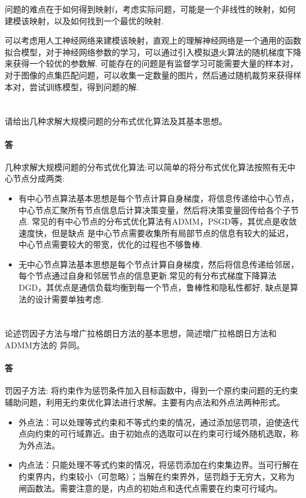 \documentclass[a4paper]{article}
\begin{document}
问题的难点在于如何得到映射f，考虑实际问题，可能是一个非线性的映射，如何建模该映射，以及如何找到一个最优的映射.

可以考虑用人工神经网络来建模该映射，直观上的理解神经网络是一个通用的函数拟合模型，对于神经网络参数的学习，可以通过引入模拟退火算法的随机梯度下降来获得一个较优的参数解. 可能存在的问题是有监督学习可能需要大量的样本对，对于图像的点集匹配问题，可以收集一定数量的图片，然后通过随机裁剪来获得样本对，尝试训练模型，得到问题的解.


\section{}
请给出几种求解大规模问题的分布式优化算法及其基本思想。 

\paragraph{答}
几种求解大规模问题的分布式优化算法:可以简单的将分布式优化算法按照有无中心节点分成两类:
\begin{itemize}
   \item 有中心节点算法基本思想是每个节点计算自身梯度，将信息传递给中心节点，中心节点汇聚所有节点信息后计算决策变量，然后将决策变量回传给各个子节点.
常见的有中心节点的分布式优化算法有ADMM，PSGD等，其优点是收敛速度快，但是缺点
是中心节点需要收集所有局部节点的信息有较大的延迟，中心节点需要较大的带宽，优化的过程也不够鲁棒.
    \item 无中心节点算法基本思想是每个节点计算自身梯度，然后将信息传递给邻居，每个节点通过自身和邻居节点的信息更新.常见的有分布式梯度下降算法DGD，其优点是通信负载均衡到每一个节点，鲁棒性和隐私性都好, 缺点是算法的设计需要单独考虑.
\end{itemize}


\section{}
论述罚因子方法与增广拉格朗日方法的基本思想，简述增广拉格朗日方法和ADMM方法的
异同。 
\paragraph{答}

罚因子方法: 将约束作为惩罚条件加入目标函数中，得到一个原约束问题的无约束辅助问题，利用无约束优化算法进行求解。主要有内点法和外点法两种形式。

\begin{itemize}
    \item 外点法：可以处理等式约束和不等式约束的情况，通过添加惩罚项，迫使迭代点向约束的可行域靠近。由于初始点的选取可以在约束可行域外随机选取，称为外点法。
    \item 内点法：只能处理不等式约束的情况，将惩罚添加在约束集边界。当可行解在约束界内，约束较小（可忽略）；当解在约束界外，惩罚趋于无穷大，又称为闸函数法。需要注意的是，内点的初始点和迭代点需要在约束可行域内。
\end{itemize}
\end{document}
